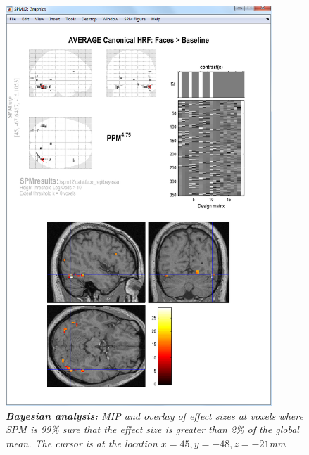 \begin{figure}
\begin{center}
\includegraphics[width=100mm]{faces/face_bayes}
\caption{\em {\bf Bayesian analysis:} MIP and overlay of effect sizes at voxels where SPM is 99\% sure that the effect size is greater than 2\% of the global mean. The cursor is at the location $x=45,y=-48,z=-21$mm\label{face_bayes} }
\end{center}
\end{figure}


